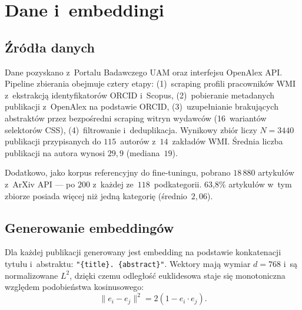 \documentclass[a4paper,11pt,twocolumn]{article}
\begin{document}
\section{Dane i~embeddingi}
\label{sec:data}

\subsection{Źródła danych}

Dane pozyskano z~Portalu Badawczego UAM oraz interfejsu OpenAlex API.
Pipeline zbierania obejmuje cztery etapy: (1)~scraping profili pracowników
WMI z~ekstrakcją identyfikatorów ORCID i~Scopus, (2)~pobieranie metadanych
publikacji z~OpenAlex na podstawie ORCID, (3)~uzupełnianie brakujących
abstraktów przez bezpośredni scraping witryn wydawców (16~wariantów
selektorów CSS), (4)~filtrowanie i~deduplikacja. Wynikowy zbiór liczy
$N=3440$ publikacji przypisanych do $115$~autorów z~$14$~zakładów WMI.
Średnia liczba publikacji na autora wynosi $29{,}9$ (mediana~$19$).



Dodatkowo, jako korpus referencyjny do fine-tuningu, pobrano $18\,880$
artykułów z~ArXiv API --- po $200$ z~każdej ze~$118$~podkategorii.
63,8\% artykułów w~tym zbiorze posiada więcej niż jedną kategorię
(średnio~$2{,}06$).

\subsection{Generowanie embeddingów}

Dla każdej publikacji generowany jest embedding na podstawie konkatenacji
tytułu i~abstraktu: \texttt{"\{title\}. \{abstract\}"}. Wektory mają
wymiar $d=768$ i~są normalizowane $L^2$, dzięki czemu odległość
euklidesowa staje się monotoniczna względem podobieństwa kosinusowego:
\begin{equation}
  \|e_i - e_j\|^2 = 2(1 - e_i \cdot e_j).
  \label{eq:cosine}
\end{equation}
\end{document}
